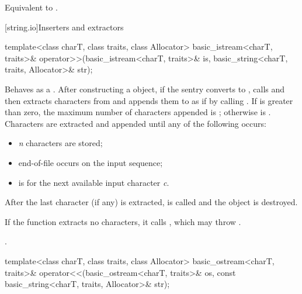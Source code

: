 \begin{itemdescr}
\pnum
\effects
Equivalent to .
\end{itemdescr}

[string.io]{Inserters and extractors}

%
\begin{itemdecl}
template<class charT, class traits, class Allocator>
  basic_istream<charT, traits>&
    operator>>(basic_istream<charT, traits>& is, basic_string<charT, traits, Allocator>& str);
\end{itemdecl}

\begin{itemdescr}
\pnum
\effects
Behaves as a .
After constructing a
object, if the sentry converts to , calls
and then extracts characters from  and appends them
to  as if by calling
.
If
is greater than zero, the maximum
number  of characters appended is
;
otherwise  is
.
Characters are extracted and appended until any of the following
occurs:
\begin{itemize}
\item
\textit{n}
characters are stored;
\item
end-of-file occurs on the input sequence;
\item
{}
is  for the next available input character
\textit{c}.
\end{itemize}

\pnum
After the last character (if any) is extracted,
is called and the
object is destroyed.

\pnum
If the function extracts no characters, it calls
,
which may throw
.

\pnum
\returns
{}.
\end{itemdescr}

%
\begin{itemdecl}
template<class charT, class traits, class Allocator>
  basic_ostream<charT, traits>&
    operator<<(basic_ostream<charT, traits>& os,
               const basic_string<charT, traits, Allocator>& str);
\end{itemdecl}

